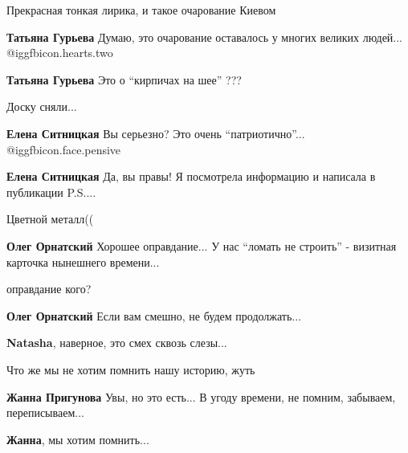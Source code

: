  
 
 
 
 
\zzSecCmt

\begin{itemize} %
Прекрасная тонкая лирика, и такое очарование Киевом

\textbf{Татьяна Гурьева}
Думаю, это очарование оставалось у многих великих людей... @igg{fbicon.hearts.two} 

\textbf{Татьяна Гурьева} Это о \enquote{кирпичах на шее} ???

Доску сняли...

\begin{itemize} %
\textbf{Елена Ситницкая}
Вы серьезно?
Это очень \enquote{патриотично}... @igg{fbicon.face.pensive} 

\textbf{Елена Ситницкая}
Да, вы правы! Я посмотрела информацию и написала в публикации P.S....

Цветной металл((

\begin{itemize} %
\textbf{Олег Орнатский}
Хорошее оправдание... У нас \enquote{ломать не строить} - визитная карточка нынешнего времени...

оправдание кого?

\textbf{Олег Орнатский}
Если вам смешно, не будем продолжать...

\textbf{Natasha}, наверное, это смех сквозь слезы...
\end{itemize} %

\end{itemize} %

Что же мы не хотим помнить нашу историю, жуть

\textbf{Жанна Пригунова}
Увы, но это есть... В угоду времени, не помним, забываем, переписываем...

\textbf{Жанна}, мы хотим помнить...


\end{itemize}
